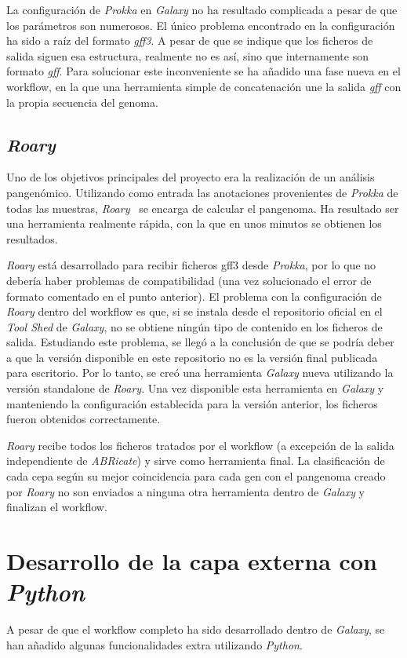 La configuración de \textit{Prokka} en \textit{Galaxy} no ha resultado complicada a pesar de que los parámetros son numerosos. El único problema encontrado en la configuración ha sido a raíz del formato \textit{gff3}. A pesar de que se indique que los ficheros de salida siguen esa estructura, realmente no es así, sino que internamente son formato \textit{gff}. Para solucionar este inconveniente se ha añadido una fase nueva en el workflow, en la que una herramienta simple de concatenación une la salida \textit{gff} con la propia secuencia del genoma.

\subsection{\itshape{Roary}}
Uno de los objetivos principales del proyecto era la realización de un análisis pangenómico. Utilizando como entrada las anotaciones provenientes de \textit{Prokka} de todas las muestras, \textit{Roary}~\cite{Page2015} se encarga de calcular el pangenoma. Ha resultado ser una herramienta realmente rápida, con la que en unos minutos se obtienen los resultados.

\textit{Roary} está desarrollado para recibir ficheros gff3 desde \textit{Prokka}, por lo que no debería haber problemas de compatibilidad (una vez solucionado el error de formato comentado en el punto anterior). El problema con la configuración de \textit{Roary} dentro del workflow es que, si se instala desde el repositorio oficial en el \textit{Tool Shed} de \textit{Galaxy}, no se obtiene ningún tipo de contenido en los ficheros de salida. Estudiando este problema, se llegó a la conclusión de que se podría deber a que la versión disponible en este repositorio no es la versión final publicada para escritorio. Por lo tanto, se creó una herramienta \textit{Galaxy} nueva utilizando la versión standalone de \textit{Roary}. Una vez disponible esta herramienta en \textit{Galaxy} y manteniendo la configuración establecida para la versión anterior, los ficheros fueron obtenidos correctamente.

\textit{Roary} recibe todos los ficheros tratados por el workflow (a excepción de la salida independiente de \textit{ABRicate}) y sirve como herramienta final. La clasificación de cada cepa según su mejor coincidencia para cada gen con el pangenoma creado por \textit{Roary} no son enviados a ninguna otra herramienta dentro de \textit{Galaxy} y finalizan el workflow.


\section{Desarrollo de la capa externa con \itshape{Python}}
A pesar de que el workflow completo ha sido desarrollado dentro de \textit{Galaxy}, se han añadido algunas funcionalidades extra utilizando \textit{Python}.

